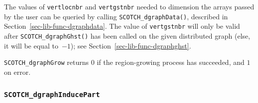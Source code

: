 \begin{itemize}
The values of \texttt{vertlocnbr} and \texttt{vertgstnbr} needed to
dimension the arrays passed by the user can be queried by calling
\texttt{SCOTCH\_\lbt dgraph\lbt Data()}, described in
Section~\ref{sec-lib-func-dgraphdata}. The value of
\texttt{vertgstnbr} will only be valid after
\texttt{SCOTCH\_\lbt dgraph\lbt Ghst()} has been called on the given
distributed graph (else, it will be equal to~$-1$); see
Section~\ref{sec-lib-func-dgraphghst}.

\progret

{\tt SCOTCH\_dgraphGrow} returns $0$ if the region-growing process has
succeeded, and $1$ on error.
\end{itemize}

\subsubsection{{\tt SCOTCH\_dgraphInducePart}}


